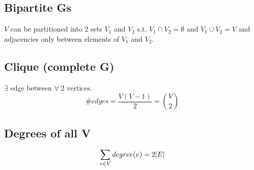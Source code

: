 \documentclass{article}
\begin{document}
\subsection{Bipartite Gs}
    \begin{definition}
        $V$ can be partitioned into $2$ sets $V_1$ and $V_2$ s.t. $V_1 \cap V_2 = \emptyset$ and $V_1 \cup V_2 = V$ and adjacencies only between elements of $V_1$ and $V_2$.
    \end{definition}

\subsection{Clique (complete G)}
\begin{definition}
    $\exists$ edge between $\forall \; 2$ vertices. 
    \begin{equation}
        \# edges = \frac{V(V-1)}{2} = \binom{V}{2}
    \end{equation}
\end{definition}

\subsection{Degrees of all V}
\begin{definition}
    \begin{equation}
        \sum_{v\in V} degree(v) = 2\abs{E}
    \end{equation}
\end{definition}
\end{document}
